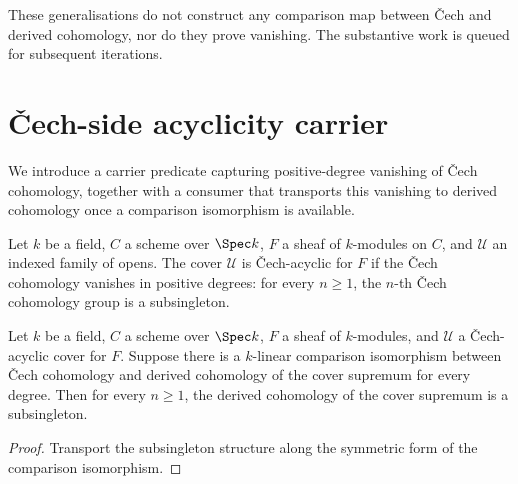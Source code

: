 \begin{remark}
  These generalisations do not construct any comparison map between \v{C}ech and derived cohomology, nor do they prove vanishing. The substantive work is queued for subsequent iterations.
\end{remark}

\section{\v{C}ech-side acyclicity carrier}
\label{sec:moduleK_cech_acyclic_cover}

We introduce a carrier predicate capturing positive-degree vanishing of \v{C}ech cohomology, together with a consumer that transports this vanishing to derived cohomology once a comparison isomorphism is available.

\begin{definition}
  \label{def:Scheme_IsCechAcyclicCover}
  
  Let \(k\) be a field, \(C\) a scheme over \(\Spec k\), \(F\) a sheaf of \(k\)-modules on \(C\), and \(\mathcal U\) an indexed family of opens. The cover \(\mathcal U\) is \v{C}ech-acyclic for \(F\) if the \v{C}ech cohomology vanishes in positive degrees: for every \(n \ge 1\), the \(n\)-th \v{C}ech cohomology group is a subsingleton.
\end{definition}

\begin{theorem}
  \label{thm:Scheme_subsingleton_HModule_prime_supr_of_isCechAcyclicCover}
  
  Let \(k\) be a field, \(C\) a scheme over \(\Spec k\), \(F\) a sheaf of \(k\)-modules, and \(\mathcal U\) a \v{C}ech-acyclic cover for \(F\). Suppose there is a \(k\)-linear comparison isomorphism between \v{C}ech cohomology and derived cohomology of the cover supremum for every degree. Then for every \(n \ge 1\), the derived cohomology of the cover supremum is a subsingleton.
\end{theorem}

\begin{proof}
  
  \leanok
  Transport the subsingleton structure along the symmetric form of the comparison isomorphism.
\end{proof}

